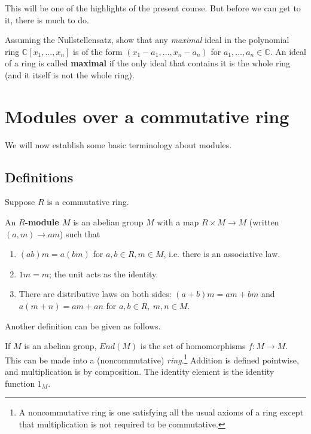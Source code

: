 This will be one of the highlights of the present course. But before we can
get to it, there is much to do.

\begin{exercise} 
Assuming the Nullstellensatz, show that any \emph{maximal} ideal in the
polynomial ring $\mathbb{C}[x_1, \dots, x_n]$ is of the form 
$(x_1-a_1, \dots, x_n-a_n)$ for $a_1, \dots, a_n \in \mathbb{C}$. An ideal of a
ring is called \textbf{maximal} if the only ideal that contains it is the
whole ring (and it itself is not the whole ring).
\end{exercise} 

\section{Modules over a commutative ring}



We will now establish some basic terminology about modules.

\subsection{Definitions}
Suppose $R$ is a commutative ring.  

\begin{definition} 
An \textbf{$R$-module $M$} is an abelian group $M$ with a map $R \times M \to
M$ (written $(a,m) \to am$) such that
\begin{enumerate}[\textbf{M} 1]
\item  $(ab) m = a(bm)$ for $a,b \in R, m \in M$, i.e. there is an associative law. 
\item $1m
= m$; the unit acts as the identity. 
\item There are distributive laws
on both sides:
$(a+b)m = am + bm$ and $a(m+n) = am + an$ for $a,b \in R, \ m,n \in M$.

\end{enumerate} \end{definition} 

Another definition can be given  as follows.
\begin{definition} 
If $M$ is an abelian group, $End(M)$ is the set of homomorphisms $f: M \to M$.  
This can be made into a (noncommutative) \emph{ring}.\footnote{A
noncommutative ring is one satisfying all the usual axioms of a ring except
that multiplication is not required to be commutative.} Addition is defined pointwise, and
multiplication is by composition. The identity element is the identity
function $1_M$.
\end{definition} 

